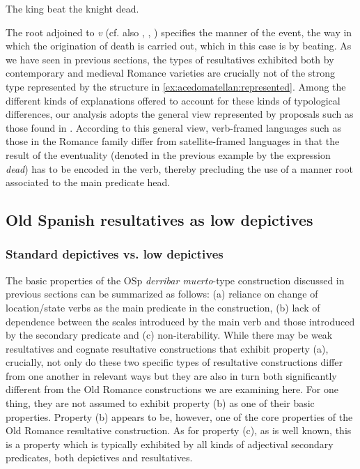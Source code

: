\documentclass[output=paper,colorlinks,citecolor=brown,
]{langscibook}
\begin{document}
\ea\label{ex:acedomatellan:represented}
  The king beat the knight dead. \\

\z

\noindent The root adjoined to \textit{v} (cf. also \citealt{Embick2004}, \citealt{McIntyre2004}, \citealt{Harley2005}) specifies the manner of the event, the way in which the origination of death is carried out, which in this case is by beating. As we have seen in previous sections, the types of resultatives exhibited both by contemporary and medieval Romance varieties are crucially not of the strong type represented by the structure in \ref{ex:acedomatellan:represented}.  Among the different kinds of explanations offered to account for these kinds of typological differences, our analysis adopts the general view represented by proposals such as those found in \citet{Klipple1997, MateuandRigau2002, Acedo-Matellan2016}. According to this general view, verb-framed languages such as those in the Romance family differ from satellite-framed languages in that the result of the eventuality (denoted in the previous example by the expression \emph{dead}) has to be encoded in the verb, thereby precluding the use of a manner root associated to the main predicate head.

\subsection{Old Spanish resultatives as low depictives}\label{sec:acedomatellan:4-2}
\subsubsection{Standard depictives vs. low depictives}\label{sec:acedomatellan:4-2-1}

The basic properties of the OSp \textit{derribar muerto}-type construction discussed in previous sections can be summarized as follows: (a) reliance on change of location/state verbs as the main predicate in the construction, (b) lack of dependence between the scales introduced by the main verb and those introduced by the secondary predicate and (c) non-iterability. While there may be weak resultatives and cognate resultative constructions that exhibit property (a), crucially, not only do these two specific types of resultative constructions differ from one another in relevant ways but they are also in turn both significantly different from the Old Romance constructions we are examining here. For one thing, they are not assumed to exhibit property (b) as one of their basic properties. Property (b) appears to be, however, one of the core properties of the Old Romance resultative construction. As for property (c), as is well known, this is a property which is typically exhibited by all kinds of adjectival secondary predicates, both depictives and resultatives. 
\end{document}
